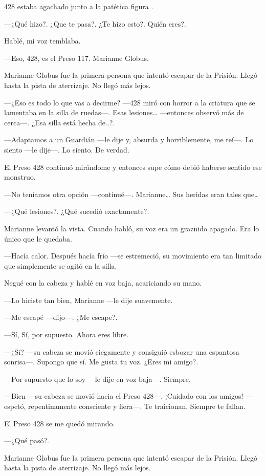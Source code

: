 428 estaba agachado junto a la patética figura .

---¿Qué hizo?. ¿Que te pasa?. ¿Te hizo esto?. Quién eres?.

Hablé, mi voz temblaba.

---Eso, 428, es el Preso 117. Marianne Globus.

Marianne Globus fue la primera persona que intentó escapar de la
Prisión. Llegó hasta la pista de aterrizaje. No llegó más lejos.

---¿Eso es todo lo que vas a decirme? ---428 miró con horror a la
criatura que se lamentaba en la silla de ruedas---. Esas
lesiones\ldots{} ---entonces observó más de cerca---. ¿Esa silla está
hecha de..?.

---Adaptamos a un Guardián ---le dije y, absurda y horriblemente, me
reí---. Lo siento ---le dije---. Lo siento. De verdad.

El Preso 428 continuó mirándome y entonces supe cómo debió haberse
sentido ese monstruo.

---No teníamos otra opción ---continué---. Marianne\ldots{} Sus heridas
eran tales que\ldots{}

---¿Qué lesiones?. ¿Qué sucedió exactamente?.

Marianne levantó la vista. Cuando habló, su voz era un graznido apagado.
Era lo único que le quedaba.

---Hacía calor. Después hacía frío ---se estremeció, su movimiento era
tan limitado que simplemente se agitó en la silla.

Negué con la cabeza y hablé en voz baja, acariciando su mano.

---Lo hiciste tan bien, Marianne ---le dije suavemente.

---Me escapé ---dijo---. ¿Me escape?.

---Sí, Sí, por supuesto. Ahora eres libre.

---¿Sí? ---su cabeza se movió ciegamente y consiguió esbozar una
espantosa sonrisa---. Supongo que sí. Me gusta tu voz. ¿Eres mi amigo?.

---Por supuesto que lo soy ---le dije en voz baja---. Siempre.

---Bien ---su cabeza se movió hacia el Preso 428---. ¡Cuidado con los
amigos! ---espetó, repentinamente consciente y fiera---. Te traicionan.
Siempre te fallan.

El Preso 428 se me quedó mirando.

---¿Qué pasó?.

Marianne Globus fue la primera persona que intentó escapar de la
Prisión. Llegó hasta la pista de aterrizaje. No llegó más lejos.

